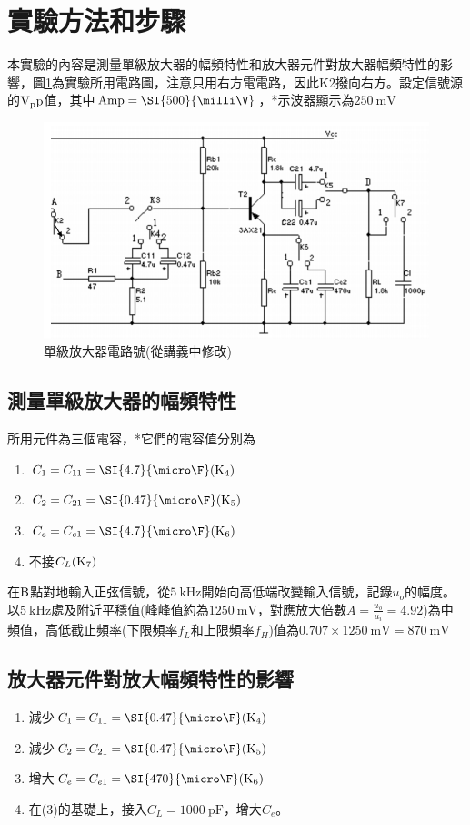 \documentclass[a4paper]{article}
\begin{document}
\section{實驗方法和步驟}
\hspace{2em}本實驗的內容是測量單級放大器的幅頻特性和放大器元件對放大器幅頻特性的影響，圖\ref{fig1}為實驗所用電路圖，注意只用右方電電路，因此K2撥向右方。設定信號源的$\rm{V_pp}$值，其中$\rm{Amp} = \SI{500}{\milli\V}$，*示波器顯示為$\SI{250}{\milli\V}$\par
\begin{figure}[H]
    \centering
    \includegraphics[width=.7\textwidth]{fig1.png}
    \caption{單級放大器電路號(從講義中修改)}
    \label{fig1}
\end{figure}
\subsection{測量單級放大器的幅頻特性}
\hspace{2em}所用元件為三個電容，*它們的電容值分別為
\begin{enumerate}
    \item $C_1=C_{11}=\SI{4.7}{\micro\F}(\rm{K_4})$
    \item $C_2=C_{21}=\SI{0.47}{\micro\F}(\rm{K_5})$ 
    \item $C_e=C_{e1}=\SI{4.7}{\micro\F}(\rm{K_6})$
    \item 不接$C_L(\rm{K_7})$
\end{enumerate}
    \hspace{2em}在$\rm{B}$點對地輸入正弦信號，從$\SI{5}{\kilo\Hz}$開始向高低端改變輸入信號，記錄$u_o$的幅度。以$\SI{5}{\kilo\Hz}$處及附近平穩值(峰峰值約為$\SI{1250}{\milli\V}$，對應放大倍數$A=\frac{u_o}{u_i}=4.92$)為中頻值，高低截止頻率(下限頻率$f_L$和上限頻率$f_H$)值為$0.707\times\SI{1250}{\milli\V}=\SI{870}{\milli \V}$\par
\subsection{放大器元件對放大幅頻特性的影響}
\begin{enumerate}
    \item 減少$C_1=C_{11}=\SI{0.47}{\micro\F}(\rm{K_4})$
    \item 減少$C_2=C_{21}=\SI{0.47}{\micro\F}(\rm{K_5})$
    \item 增大$C_e=C_{e1}=\SI{470}{\micro\F}(\rm{K_6})$
    \item 在(3)的基礎上，接入$C_L=\SI{1000}{\pico\F}$，增大$C_e$。
\end{enumerate}
\end{document}
